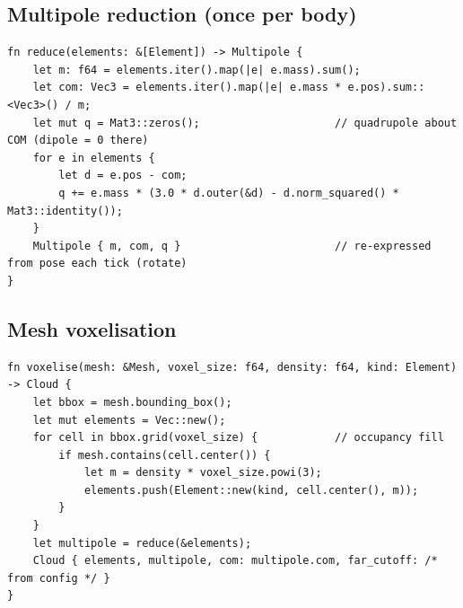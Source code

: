 \documentclass[11pt,a4paper]{article}
\theoremstyle{reqstyle}
\begin{document}
\subsection{Multipole reduction (once per body)}
\begin{lstlisting}
fn reduce(elements: &[Element]) -> Multipole {
    let m: f64 = elements.iter().map(|e| e.mass).sum();
    let com: Vec3 = elements.iter().map(|e| e.mass * e.pos).sum::<Vec3>() / m;
    let mut q = Mat3::zeros();                     // quadrupole about COM (dipole = 0 there)
    for e in elements {
        let d = e.pos - com;
        q += e.mass * (3.0 * d.outer(&d) - d.norm_squared() * Mat3::identity());
    }
    Multipole { m, com, q }                        // re-expressed from pose each tick (rotate)
}
\end{lstlisting}

\subsection{Mesh voxelisation}
\begin{lstlisting}
fn voxelise(mesh: &Mesh, voxel_size: f64, density: f64, kind: Element) -> Cloud {
    let bbox = mesh.bounding_box();
    let mut elements = Vec::new();
    for cell in bbox.grid(voxel_size) {            // occupancy fill
        if mesh.contains(cell.center()) {
            let m = density * voxel_size.powi(3);
            elements.push(Element::new(kind, cell.center(), m));
        }
    }
    let multipole = reduce(&elements);
    Cloud { elements, multipole, com: multipole.com, far_cutoff: /* from config */ }
}
\end{lstlisting}
\end{document}
